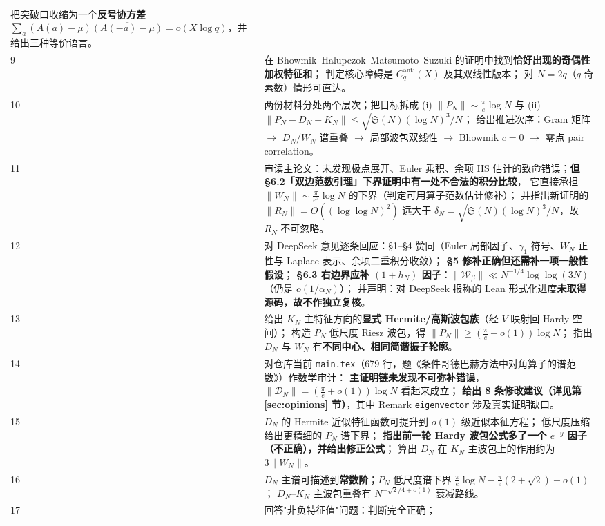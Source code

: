 \documentclass[11pt,a4paper]{ctexart}
\newcommand{\al}{\alpha_{N}}
\newcommand{\be}{\beta}
\begin{document}
\begin{longtable}{@{}p{1.05cm}p{13.6cm}@{}}
把突破口收缩为一个\textbf{反号协方差}
$\sum_a(A(a)-\mu)\overline{(A(-a)-\mu)}=o(X\log q)$，并给出三种等价语言。\\
9 &
在 Bhowmik--Halupczok--Matsumoto--Suzuki 的证明中找到\textbf{恰好出现的奇偶性加权特征和}；
判定核心障碍是 $C_q^{\mathrm{anti}}(X)$ 及其双线性版本；
对 $N=2q$（$q$ 奇素数）情形可直达。\\
10 &
两份材料分处两个层次；把目标拆成
(i) $\|P_N\|\sim\frac{\pi}{e}\log N$ 与
(ii) $\|P_N-D_N-K_N\|\le\sqrt{\mathfrak S(N)(\log N)^3/N}$；
给出推进次序：Gram 矩阵 $\to$ $D_N/W_N$ 谱重叠 $\to$ 局部波包双线性 $\to$ Bhowmik $c=0$ $\to$ 零点 pair correlation。\\
11 &
审读主论文：未发现极点展开、Euler 乘积、余项 HS 估计的致命错误；\textbf{但 §6.2「双边范数引理」下界证明中有一处不合法的积分比较}，
它直接承担 $\|W_N\|\sim\frac{\pi}{e^3}\log N$ 的下界（判定可用算子范数估计修补）；
并指出新证明的 $\|R_N\|=O((\log\log N)^2)$ 远大于 $\delta_N=\sqrt{\mathfrak S(N)(\log N)^3/N}$，故 $R_N$ 不可忽略。\\
12 &
对 DeepSeek 意见逐条回应：\S1--\S4 赞同（Euler 局部因子、$\gamma_1$ 符号、$W_N$ 正性与 Laplace 表示、余项二重积分收敛）；
\textbf{§5 修补正确但还需补一项一般性假设}；
\textbf{§6.3 右边界应补 $(1+h_N)$ 因子}：$\|\mathcal W_{\be}\|\ll N^{-1/4}\log\log(3N)$（仍是 $o(1/\al)$）；
并声明：对 DeepSeek 报称的 Lean 形式化进度\textbf{未取得源码，故不作独立复核}。\\
13 &
给出 $K_N$ 主特征方向的\textbf{显式 Hermite/高斯波包族}（经 $V$ 映射回 Hardy 空间）；
构造 $P_N$ 低尺度 Riesz 波包，得 $\|P_N\|\ge(\frac{\pi}{e}+o(1))\log N$；
指出 $D_N$ 与 $W_N$ 有\textbf{不同中心、相同简谐振子轮廓}。\\
14 &
对仓库当前 \texttt{main.tex}（679 行，题《条件哥德巴赫方法中对角算子的谱范数》）作数学审计：
\textbf{主证明链未发现不可弥补错误}，$\|\mathcal D_N\|=(\frac{\pi}{e}+o(1))\log N$ 看起来成立；
\textbf{给出 8 条修改建议（详见第 \ref{sec:opinions} 节）}，其中 Remark \texttt{eigenvector} 涉及真实证明缺口。\\
15 &
$D_N$ 的 Hermite 近似特征函数可提升到 $o(1)$ 级近似本征方程；
低尺度压缩给出更精细的 $P_N$ 谱下界；
\textbf{指出前一轮 Hardy 波包公式多了一个 $e^{-y}$ 因子（不正确），并给出修正公式}；
算出 $D_N$ 在 $K_N$ 主波包上的作用约为 $3\|W_N\|$。\\
16 &
$D_N$ 主谱可描述到\textbf{常数阶}；$P_N$ 低尺度谱下界
$\frac{\pi}{e}\log N-\frac{\pi}{e}(2+\sqrt2)+o(1)$；
$D_N$--$K_N$ 主波包重叠有 $N^{-\sqrt2/4+o(1)}$ 衰减路线。\\
17 &
回答"非负特征值"问题：判断完全正确；

\end{longtable}
\end{document}
